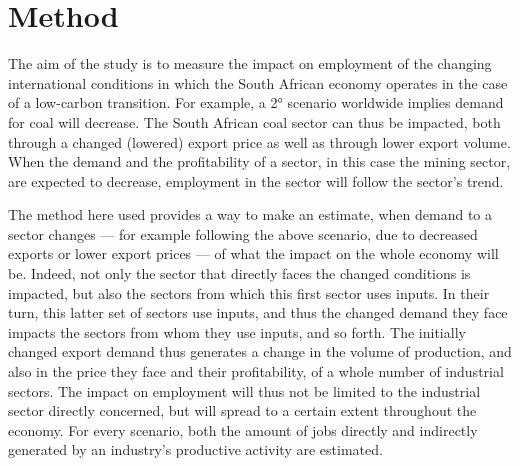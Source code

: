 \documentclass[12pt,english]{article}
\begin{document}
\section{Method}

The aim of the study is to measure the impact on employment of the changing international conditions in which the South African economy operates in the case of a low-carbon transition. For example, a 2° scenario worldwide implies demand for coal will decrease. The South African coal sector can thus be impacted, both through a changed (lowered) export price as well as through lower export volume. When the demand and the profitability of a sector, in this case the mining sector, are expected to decrease, employment in the sector will follow the sector's trend.


The method here used provides a way to make an estimate, when demand to a sector changes --- for example following the above scenario, due to decreased exports or lower export prices --- of what the impact on the whole economy  will be. Indeed, not only the sector that directly faces the changed conditions is impacted, but also the sectors from which this first sector uses inputs. In their turn, this latter set of sectors use inputs, and thus the changed demand they face impacts the sectors from whom they use inputs, and so forth. The initially changed export demand thus generates a change in the volume of production, and also in the price they face and their profitability, of a whole number of industrial sectors. The impact on employment will thus not be limited to the industrial sector directly concerned, but will spread to a certain extent throughout the economy. For every scenario, both the amount of jobs directly and indirectly generated by an industry's productive activity are estimated.

\end{document}
